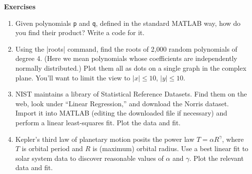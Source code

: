 \documentclass[11pt]{article}
\begin{document}
\begin{center}
  \bf Exercises
\end{center}

\begin{enumerate}
\item Given polynomials \texttt{p} and \texttt{q}, defined in the
  standard MATLAB way, how do you find their product? Write a
  code for it.
\item Using the |roots| command, find the roots of 2,000 random polynomials
  of degree 4. (Here we mean polynomials whose coefficients are
  independently normally distributed.) Plot them all as dots on a
  single graph in the complex plane. You'll want to limit the view to
  $|x|\le 10$, $|y| \le 10$. 
\item NIST maintains a library of Statistical Reference Datasets. Find
  them on the web, look under ``Linear Regression,'' and download the
  Norris dataset. Import it into MATLAB (editing the downloaded file
  if necessary) and perform a linear least-squares fit. Plot the data
  and fit.
\item Kepler's third law of planetary motion posits the power law
  $T=\alpha R^\gamma$, where $T$ is orbital period and $R$ is
  (maximum) orbital radius. Use a best linear fit to solar system data
  to discover reasonable values of $\alpha$ and $\gamma$. Plot the
  relevant data and fit.
\end{enumerate}
\end{document}
